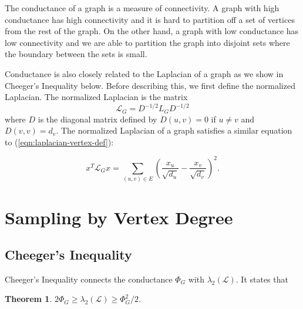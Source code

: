 \documentclass[12pt,twoside]{article}
\newtheorem{thm}{Theorem}
\begin{document}
The conductance of a graph is a measure of connectivity. A graph with high conductance has high connectivity and it is hard to partition off a set of vertices from the rest of the graph. On the other hand, a graph with low conductance has low connectivity and we are able to partition the graph into disjoint sets where the boundary between the sets is small. 

Conductance is also closely related to the Laplacian of a graph as we show in Cheeger's Inequality below. Before describing this, we first define the normalized Laplacian. The normalized Laplacian is the matrix
%
\begin{equation}
\label{def:normalized-laplacian}
\mathcal{L}_G = D^{-1/2}L_GD^{-1/2}
\end{equation}
%
where $D$ is the diagonal matrix defined by $D(u,v) = 0$ if $u \neq v$ and $D(v,v) = d_v$. The normalized Laplacian of a graph satisfies a similar equation to (\ref{eqn:laplacian-vertex-def}):

\begin{equation}
\label{eqn:norm-laplac}
x^T \mathcal{L}_G x = \sum_{(u,v) \in E} \left(\frac{x_u}{\sqrt{d_u}}-\frac{x_v}{\sqrt{d_v}}\right)^2.
\end{equation}

\section{Sampling by Vertex Degree}

\subsection{Cheeger's Inequality} %
Cheeger's Inequality connects the conductance $\Phi_G$ with $\lambda_2(\mathcal{L})$. It states that

\begin{thm}
$2\Phi_G \geq \lambda_2(\mathcal{L}) \geq \Phi_G^2/2$.
\end{thm}
\end{document}
